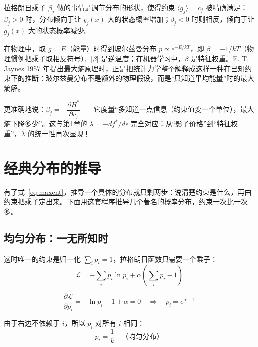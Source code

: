 \begin{physicalmeaning}
拉格朗日乘子 $\beta_j$ 做的事情是调节分布的形状，使得约束 $\langle g_j \rangle = c_j$ 被精确满足：$\beta_j > 0$ 时，分布倾向于让 $g_j(x)$ 大的状态概率增加；$\beta_j < 0$ 时则相反，倾向于让 $g_j(x)$ 大的状态概率减少。

在物理中，取 $g = E$（能量）时得到玻尔兹曼分布 $p \propto e^{-E/kT}$，即 $\beta = -1/kT$（物理惯例把乘子取相反符号），$|\beta|$ 是逆温度；在机器学习中，$\beta$ 是特征权重。E. T. Jaynes 1957 年提出最大熵原理时，正是把统计力学整个解释成这样一种在已知约束下的推断：玻尔兹曼分布不是额外的物理假设，而是“只知道平均能量”时的最大熵解。

更准确地说：$\beta_j = -\dfrac{\partial H^*}{\partial c_j}$——它度量“多知道一点信息（约束值变一个单位），最大熵下降多少”。这与第1章的 $\lambda = -df^*/d\epsilon$ 完全对应：从“影子价格”到“特征权重”，$\lambda$ 的统一性再次显现！
\end{physicalmeaning}

\section{经典分布的推导}

有了式~\eqref{eq:maxent}，推导一个具体的分布就只剩两步：说清楚约束是什么，再由约束把乘子定出来。下面用这套程序推导几个著名的概率分布，约束一次比一次多。

\subsection{均匀分布：一无所知时}

这时唯一的约束是归一化 $\sum_i p_i = 1$，拉格朗日函数只需要一个乘子：
\begin{equation}
\mathcal{L} = -\sum_i p_i \ln p_i + \alpha \left( \sum_i p_i - 1 \right)
\end{equation}

\begin{equation}
\frac{\partial \mathcal{L}}{\partial p_i} = -\ln p_i - 1 + \alpha = 0 \quad \Rightarrow \quad p_i = e^{\alpha - 1}
\end{equation}

由于右边不依赖于 $i$，所以 $p_i$ 对所有 $i$ 相同：
\begin{equation}
\boxed{p_i = \frac{1}{k}} \quad \text{（均匀分布）}
\end{equation}

